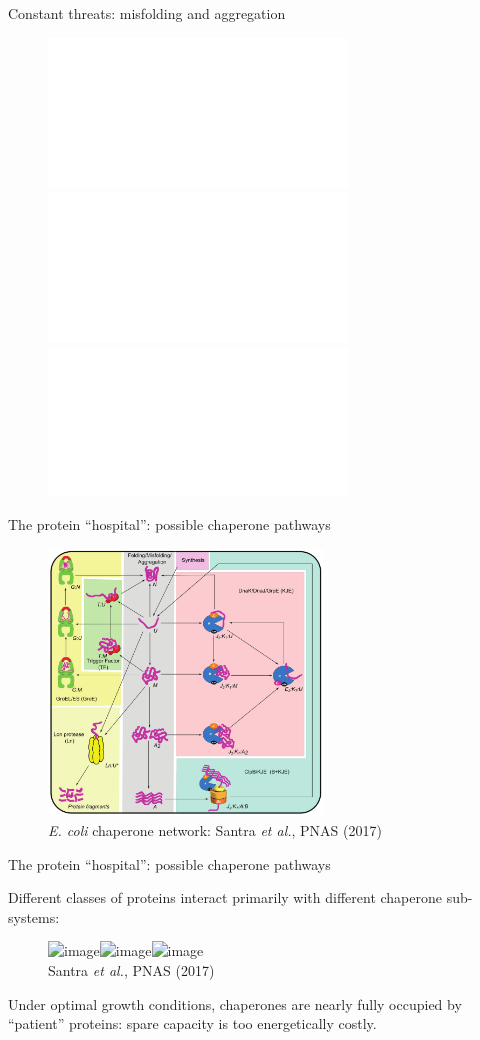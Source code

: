 \documentclass{beamer}
\begin{document}
\begin{frame}{Constant threats: misfolding and aggregation}

  \begin{figure}
    \includegraphics<1>[width=\textwidth]{misfolding1.pdf}\includegraphics<2>[width=\textwidth]{misfolding2.pdf}\includegraphics<3>[width=\textwidth]{misfolding3.pdf}
  \end{figure}
\end{frame}

\begin{frame}{The protein ``hospital'':  possible chaperone pathways}
  \vspace{0.5em}
  \begin{figure}
\centering    \includegraphics[width=0.65\textwidth]{ecoli_network.png}\\
      {{\it E. coli} chaperone network: \color{green!50!black}Santra {\it et al.}, PNAS (2017)}
  \end{figure}
\end{frame}

\begin{frame}{The protein ``hospital'':  possible chaperone pathways}

  \vspace{0.5em} Different classes of proteins interact primarily with
  different chaperone sub-systems:
  \begin{figure}
    \centering
    \includegraphics<1>[width=\textwidth]{ecoli_flux1.png}\includegraphics<2>[width=\textwidth]{ecoli_flux2.png}\includegraphics<3>[width=\textwidth]{ecoli_flux3.png}\\[1em]
 {\color{green!50!black}Santra {\it et al.}, PNAS (2017)}
  \end{figure}

  \pause\pause
      {\color{red} Under optimal growth conditions, chaperones are nearly fully occupied by ``patient'' proteins:  spare capacity is too energetically costly.}
  
\end{frame}
\end{document}
